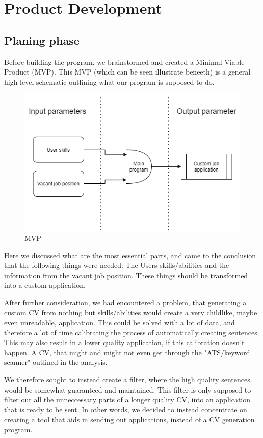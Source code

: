 \section{Product Development}\label{sec:product_development}
\subsection{Planing phase}
Before building the program, we brainstormed and created a Minimal Viable Product (MVP).
This MVP (which can be seen illustrate beneeth) is a general high level schematic outlining what our program is supposed to do.

\begin{figure}[H]
  \centering
  \includegraphics[scale = 0.6]{figures/engMVP}
  \caption{MVP}\label{fig:ie}
\end{figure}
Here we discussed what are the most essential parts, and came to the conclusion that the following things
were needed: The Users skills/abilities and the information from the vacant job position. These things
should be transformed into a custom application. 


After further consideration, we had encountered a problem, that generating a custom CV from nothing but
skills/abilities would create a very childlike, maybe even unreadable, application. This could be solved with a lot
of data, and therefore a lot of time calibrating the process of automatically creating sentences. This may also result
in a lower quality application, if this calibration doesn't happen. 
A CV, that might and might not even get through the "ATS/keyword scanner" outlined in the analysis. 

We therefore sought to instead create a filter, where the high quality sentences would be somewhat guaranteed and maintained.
This filter is only supposed to filter out all the unneccessary parts of a longer quality CV, into an application that
is ready to be sent. In other words, we decided to instead concentrate on creating a tool that aids
in sending out applications, instead of a CV generation program.


